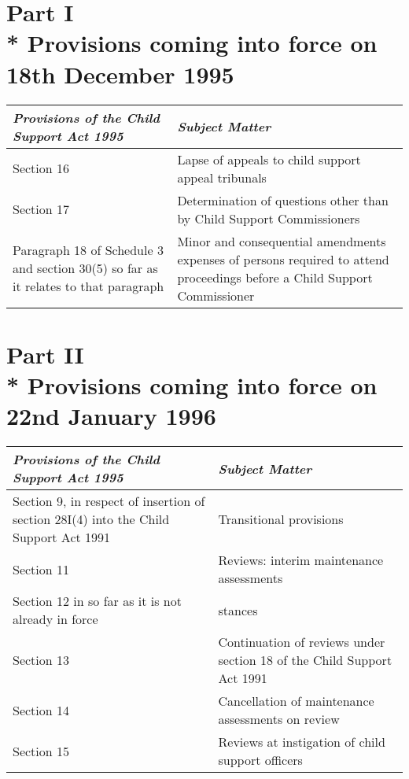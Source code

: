 \documentclass[a4paper]{article}
\newcommand{\parthead}{}
\begin{document}
\section[Part I --- Provisions coming into force on 18th December 1995]{Part I\\* Provisions coming into force on 18th December 1995}

\renewcommand\parthead{--- Schedule Part I}

\noindent
\begin{tabulary}{\linewidth}{JJ}
\hline
\itshape Provisions of the Child Support Act 1995 & \itshape Subject Matter\\
\hline
Section 16&Lapse of appeals to child support appeal tribunals\\
Section 17&Determination of questions other than by Child Support Commissioners\\
Paragraph 18 of Schedule 3 and section 30(5) so far as it relates to that paragraph&Minor and consequential amendments expenses of persons required to attend proceedings before a Child Support Commissioner\\
\hline
\end{tabulary}

\section[Part II --- Provisions coming into force on 22nd January 1996]{Part II\\* Provisions coming into force on 22nd January 1996}

\renewcommand\parthead{--- Schedule Part II}

\noindent
\begin{tabulary}{\linewidth}{JJ}
\hline
\itshape Provisions of the Child Support Act 1995 & \itshape Subject Matter\\
\hline
Section 9, in respect of insertion of section 28I(4) into the Child Support Act 1991&Transitional provisions\\
Section 11&Reviews: interim maintenance assessments\\
Section 12 in so far as it is not already in force&stances\\
Section 13&Continuation of reviews under section 18 of the Child Support Act 1991\\
Section 14&Cancellation of maintenance assessments on review\\
Section 15&Reviews at instigation of child support officers\\
\hline
\end{tabulary}
\end{document}
